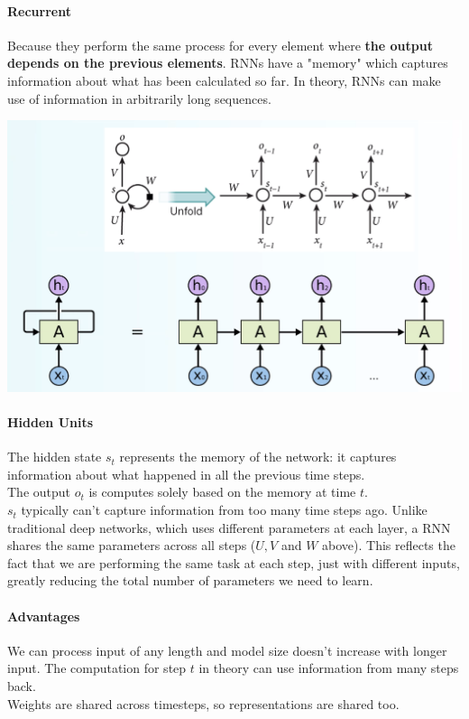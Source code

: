 \documentclass[10pt]{report}
\begin{document}
\paragraph{Recurrent} Because they perform the same process for every element where \textbf{the output depends on the previous elements}. RNNs have a "memory" which captures information about what has been calculated so far. In theory, RNNs can make use of information in arbitrarily long sequences.
\begin{center}
	\includegraphics[scale=0.5]{24.png}
\end{center}
\paragraph{Hidden Units} The hidden state $s_t$ represents the memory of the network: it captures information about what happened in all the previous time steps.\\
The output $o_t$ is computes solely based on the memory at time $t$.\\
$s_t$ typically can't capture information from too many time steps ago. Unlike traditional deep networks, which uses different parameters at each layer, a RNN shares the same parameters across all steps ($U, V$ and $W$ above). This reflects the fact that we are performing the same task at each step, just with different inputs, greatly reducing the total number of parameters we need to learn.
\paragraph{Advantages} We can process input of any length and model size doesn't increase with longer input. The computation for step $t$ in theory can use information from many steps back.\\
Weights are shared across timesteps, so representations are shared too.
\end{document}
